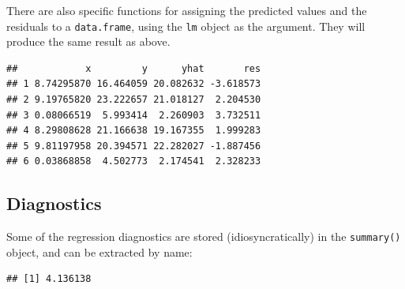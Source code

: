 \documentclass[]{book}
\newenvironment{Shaded}{\begin{snugshade}}{\end{snugshade}}
\newcommand{\KeywordTok}[1]{\textcolor[rgb]{0.13,0.29,0.53}{\textbf{#1}}}
\newcommand{\CommentTok}[1]{\textcolor[rgb]{0.56,0.35,0.01}{\textit{#1}}}
\newcommand{\OperatorTok}[1]{\textcolor[rgb]{0.81,0.36,0.00}{\textbf{#1}}}
\newcommand{\NormalTok}[1]{#1}
\theoremstyle{definition}
\theoremstyle{definition}
\theoremstyle{definition}
\theoremstyle{remark}
\begin{document}
There are also specific functions for assigning the predicted values and
the residuals to a \texttt{data.frame}, using the \texttt{lm} object as
the argument. They will produce the same result as above.

\begin{Shaded}
\end{Shaded}

\begin{verbatim}
##            x         y      yhat       res
## 1 8.74295870 16.464059 20.082632 -3.618573
## 2 9.19765820 23.222657 21.018127  2.204530
## 3 0.08066519  5.993414  2.260903  3.732511
## 4 8.29808628 21.166638 19.167355  1.999283
## 5 9.81197958 20.394571 22.282027 -1.887456
## 6 0.03868858  4.502773  2.174541  2.328233
\end{verbatim}

\subsection{Diagnostics}\label{diagnostics}

Some of the regression diagnostics are stored (idiosyncratically) in the
\texttt{summary()} object, and can be extracted by name:

\begin{Shaded}
\end{Shaded}

\begin{verbatim}
## [1] 4.136138
\end{verbatim}

\begin{Shaded}
\end{Shaded}
\end{document}
